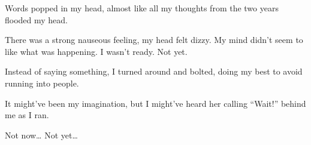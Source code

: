 Words popped in my head, almost like all my thoughts from the two years flooded my head.

There was a strong nauseous feeling, my head felt dizzy. My mind didn’t seem to like what was happening. I wasn’t ready. Not yet.

Instead of saying something, I turned around and bolted, doing my best to avoid running into people. 

It might’ve been my imagination, but I might’ve heard her calling “Wait!” behind me as I ran.

Not now… Not yet…
